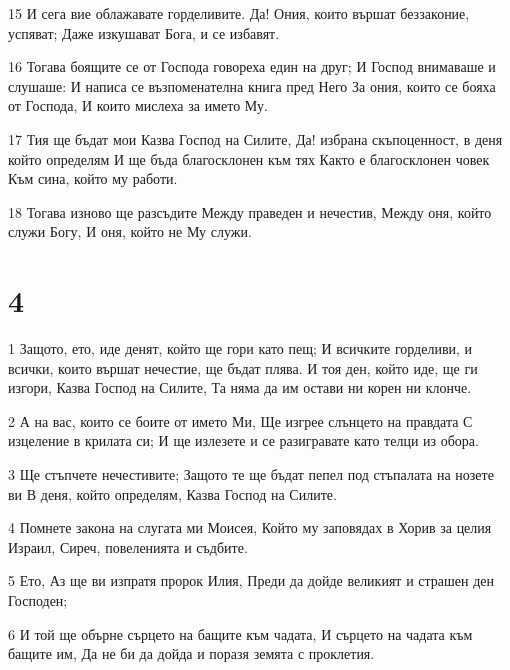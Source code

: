 \par 15 И сега вие облажавате горделивите. Да! Ония, които вършат беззаконие, успяват; Даже изкушават Бога, и се избавят.
\par 16 Тогава боящите се от Господа говореха един на друг; И Господ внимаваше и слушаше: И написа се възпоменателна книга пред Него За ония, които се бояха от Господа, И които мислеха за името Му.
\par 17 Тия ще бъдат мои Казва Господ на Силите, Да! избрана скъпоценност, в деня който определям И ще бъда благосклонен към тях Както е благосклонен човек Към сина, който му работи.
\par 18 Тогава изново ще разсъдите Между праведен и нечестив, Между оня, който служи Богу, И оня, който не Му служи.

\chapter{4}

\par 1 Защото, ето, иде денят, който ще гори като пещ; И всичките горделиви, и всички, които вършат нечестие, ще бъдат плява. И тоя ден, който иде, ще ги изгори, Казва Господ на Силите, Та няма да им остави ни корен ни клонче.
\par 2 А на вас, които се боите от името Ми, Ще изгрее слънцето на правдата С изцеление в крилата си; И ще излезете и се разигравате като телци из обора.
\par 3 Ще стъпчете нечестивите; Защото те ще бъдат пепел под стъпалата на нозете ви В деня, който определям, Казва Господ на Силите.
\par 4 Помнете закона на слугата ми Моисея, Който му заповядах в Хорив за целия Израил, Сиреч, повеленията и съдбите.
\par 5 Ето, Аз ще ви изпратя пророк Илия, Преди да дойде великият и страшен ден Господен;
\par 6 И той ще обърне сърцето на бащите към чадата, И сърцето на чадата към бащите им, Да не би да дойда и поразя земята с проклетия.

